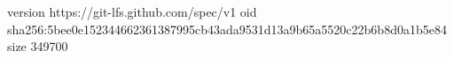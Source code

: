 version https://git-lfs.github.com/spec/v1
oid sha256:5bee0e152344662361387995cb43ada9531d13a9b65a5520c22b6b8d0a1b5e84
size 349700
